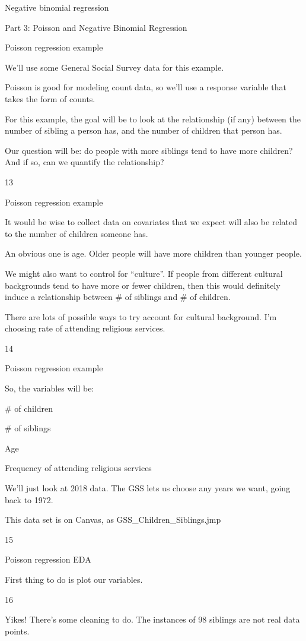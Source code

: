 \documentclass[
  letterpaper,
  DIV=11,
  numbers=noendperiod]{scrreprt}
\begin{document}
Negative binomial regression

Part 3: Poisson and Negative Binomial Regression

Poisson regression example

We'll use some General Social Survey data for this example.

Poisson is good for modeling count data, so we'll use a response
variable that takes the form of counts.

For this example, the goal will be to look at the relationship (if any)
between the number of sibling a person has, and the number of children
that person has.

Our question will be: do people with more siblings tend to have more
children? And if so, can we quantify the relationship?

13

Poisson regression example

It would be wise to collect data on covariates that we expect will also
be related to the number of children someone has.

An obvious one is age. Older people will have more children than younger
people.

We might also want to control for ``culture''. If people from different
cultural backgrounds tend to have more or fewer children, then this
would definitely induce a relationship between \# of siblings and \# of
children.

There are lots of possible ways to try account for cultural background.
I'm choosing rate of attending religious services.

14

Poisson regression example

So, the variables will be:

\# of children

\# of siblings

Age

Frequency of attending religious services

We'll just look at 2018 data. The GSS lets us choose any years we want,
going back to 1972.

This data set is on Canvas, as GSS\_Children\_Siblings.jmp

15

Poisson regression EDA

First thing to do is plot our variables.

16

Yikes! There's some cleaning to do. The instances of 98 siblings are not
real data points.
\end{document}
